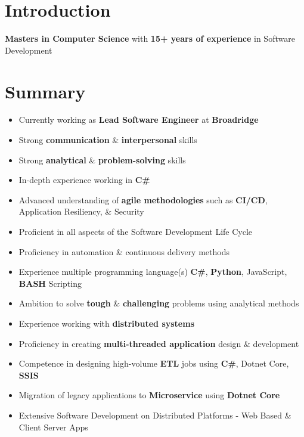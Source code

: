 \documentclass[letterpaper,11pt]{article}
\begin{document}
\section{Introduction}
\textbf{\color{darkgray}Masters in Computer Science} with \textbf{\color{darkgray}15+ years of experience} in Software Development

\section{Summary}
\begin{itemize}
    \item Currently working as \textbf{\color{darkgray}Lead Software Engineer} at \textbf{\color{darkgray}Broadridge}
    \item Strong \textbf{\color{darkgray}communication} \& \textbf{\color{darkgray}interpersonal} skills
    \item Strong \textbf{\color{darkgray}analytical} \& \textbf{\color{darkgray}problem-solving} skills
    \item In-depth experience working in \textbf{\color{darkgray}C\#}
    \item Advanced understanding of \textbf{\color{darkgray}agile methodologies} such as \textbf{\color{darkgray}CI/CD}, Application Resiliency, \& Security
    \item Proficient in all aspects of the Software Development Life Cycle
    \item Proficiency in automation \& continuous delivery methods
    \item Experience multiple programming language(s) \textbf{\color{darkgray}C\#}, \textbf{\color{darkgray}Python}, JavaScript, \textbf{\color{darkgray}BASH} Scripting
    \item Ambition to solve \textbf{\color{darkgray}tough} \& \textbf{\color{darkgray}challenging} problems using analytical methods
    \item Experience working with \textbf{\color{darkgray}distributed systems}
    \item Proficiency in creating \textbf{\color{darkgray}multi-threaded application} design \& development
    \item Competence in designing high-volume \textbf{\color{darkgray}ETL} jobs using \textbf{\color{darkgray}C\#}, Dotnet Core, \textbf{\color{darkgray}SSIS}
    \item Migration of legacy applications to \textbf{\color{darkgray}Microservice} using \textbf{\color{darkgray}Dotnet Core}
    \item Extensive Software Development on Distributed Platforms - Web Based \& Client Server Apps

\end{itemize}
\end{document}
